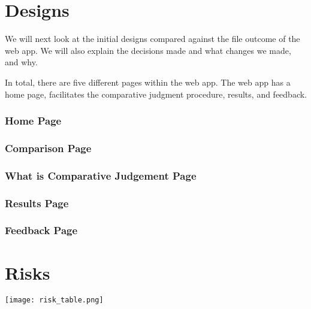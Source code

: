 	


	

\chapter{Designs}
We will next look at the initial designs compared against the file outcome of the web app. We will also explain the decisions made and what changes we made, and why. 

In total, there are five different pages within the web app. The web app has a home page, facilitates the comparative judgment procedure, results, and feedback.

\subsection{Home Page}

\subsection{Comparison Page}

\subsection{What is Comparative Judgement Page}

\subsection{Results Page}

\subsection{Feedback Page}


\chapter{Risks}


\begin{center}
	\texttt{[image: risk\_table.png]}
\end{center}



